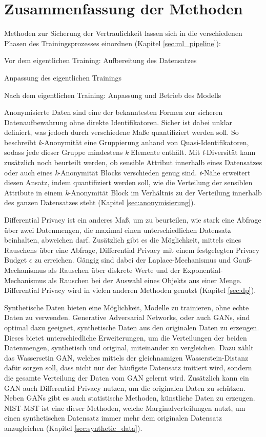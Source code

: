 \section{Zusammenfassung der Methoden}

Methoden zur Sicherung der Vertraulichkeit lassen sich in die verschiedenen Phasen des Trainingsprozesses einordnen (Kapitel \ref{sec:ml_pipeline}):
\begin{compactitem}
\item Vor dem eigentlichen Training: Aufbereitung des Datensatzes
\item Anpassung des eigentlichen Trainings
\item Nach dem eigentlichen Training: Anpassung und Betrieb des Modells
\end{compactitem}

Anonymisierte Daten sind eine der bekanntesten Formen zur sicheren Datenaufbewahrung ohne direkte Identifikatoren.
Sicher ist dabei unklar definiert, was jedoch durch verschiedene Maße quantifiziert werden soll.
So beschreibt \textit{k}-Anonymität eine Gruppierung anhand von Quasi-Identifikatoren, sodass jede dieser Gruppe mindestens \textit{k} Elemente enthält.
Mit \textit{l}-Diversität kann zusätzlich noch beurteilt werden, ob sensible Attribut innerhalb eines Datensatzes oder auch eines \textit{k}-Anonymität Blocks verschieden genug sind.
\textit{t}-Nähe erweitert diesen Ansatz, indem quantifiziert werden soll, wie die Verteilung der sensiblen Attribute in einem \textit{k}-Anonymität Block im Verhältnis zu der Verteilung innerhalb des ganzen Datensatzes steht (Kapitel \ref{sec:anonymisierung}).

Differential Privacy ist ein anderes Maß, um zu beurteilen, wie stark eine Abfrage über zwei Datenmengen, die maximal einen unterschiedlichen Datensatz beinhalten, abweichen darf.
Zusätzlich gibt es die Möglichkeit, mittels eines Rauschens über eine Abfrage, Differential Privacy mit einem festgelegten Privacy Budget $\epsilon$ zu erreichen.
Gängig sind dabei der Laplace-Mechanismus und Gauß-Mechanismus als Rauschen über diskrete Werte und der Exponential-Mechanismus als Rauschen bei der Auswahl eines Objekts aus einer Menge.
Differential Privacy wird in vielen anderen Methoden genutzt (Kapitel \ref{sec:dp}).

Synthetische Daten bieten eine Möglichkeit, Modelle zu trainieren, ohne echte Daten zu verwenden.
Generative Adversarial Networks, oder auch GANs, sind optimal dazu geeignet, synthetische Daten aus den originalen Daten zu erzeugen.
Dieses bietet unterschiedliche Erweiterungen, um die Verteilungen der beiden Datenmengen, synthetisch und original, miteinander zu vergleichen.
Dazu zählt das Wassersetin GAN, welches mittels der gleichnamigen Wasserstein-Distanz dafür sorgen soll, dass nicht nur der häufigste Datensatz imitiert wird, sondern die gesamte Verteilung der Daten vom GAN gelernt wird.
Zusätzlich kann ein GAN auch Differential Privacy nutzen, um die originalen Daten zu schützen.
Neben GANs gibt es auch statistische Methoden, künstliche Daten zu erzeugen.
NIST-MST ist eine dieser Methoden, welche Marginalverteilungen nutzt, um einen synthetischen Datensatz immer mehr dem originalen Datensatz anzugleichen (Kapitel \ref{sec:synthetic_data}).

